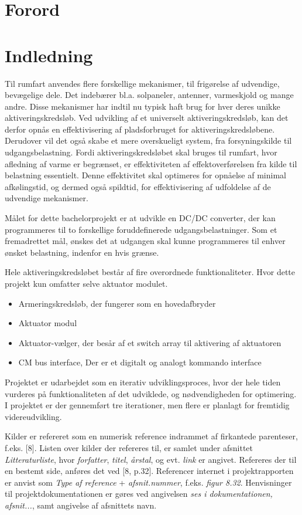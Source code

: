 
\chapter*{Forord}


{\let\clearpage\relax \chapter{Indledning}}
Til rumfart anvendes flere forskellige mekanismer, til frigørelse af udvendige, bevægelige dele. Det indebærer bl.a. solpaneler, antenner, varmeskjold og mange andre. Disse mekanismer har indtil nu typisk haft brug for hver deres unikke aktiveringskredsløb. Ved udvikling af et universelt aktiveringskredsløb, kan det derfor opnås en effektivisering af pladsforbruget for aktiveringskredsløbene. Derudover vil det også skabe et mere overskueligt system, fra forsyningskilde til udgangsbelastning. Fordi aktiveringskredsløbet skal bruges til rumfart, hvor afledning af varme er begrænset, er effektiviteten af effektoverførelsen fra kilde til belastning essentielt. Denne effektivitet skal optimeres for opnåelse af minimal afkølingstid, og dermed også spildtid, for effektivisering af udfoldelse af de udvendige mekanismer\cite{projekt-oplag}. 

Målet for dette bachelorprojekt er at udvikle en DC/DC converter, der kan programmeres til to forskellige foruddefinerede udgangsbelastninger. Som et fremadrettet mål, ønskes det at udgangen skal kunne programmeres til enhver ønsket belastning, indenfor en hvis grænse. 

\noindent
Hele aktiveringskredsløbet består af fire overordnede funktionaliteter. Hvor dette projekt kun omfatter selve aktuator modulet.
\begin{itemize}
	\item Armeringskredsløb, der fungerer som en hovedafbryder
	\item Aktuator modul
	\item Aktuator-vælger, der besår af et switch array til aktivering af aktuatoren
	\item CM bus interface, Der er et digitalt og analogt kommando interface
\end{itemize}

Projektet er udarbejdet som en iterativ udviklingsproces, hvor der hele tiden vurderes på funktionaliteten af det udviklede, og nødvendigheden for optimering. I projektet er der gennemført tre iterationer, men flere er planlagt for fremtidig videreudvikling. 

Kilder er refereret som en numerisk reference indrammet af firkantede parenteser, f.eks. [8]. Listen over kilder der refereres til, er samlet under afsnittet \textit{Litteraturliste}, hvor \textit{forfatter}, \textit{titel}, \textit{årstal}, og evt. \textit{link} er angivet. Refereres der til en bestemt side, anføres det ved [8, p.32]. Referencer internet i projektrapporten er anvist som \textit{Type af reference} + \textit{afsnit.nummer}, f.eks. \textit{figur 8.32}. Henvisninger til projektdokumentationen er gøres ved  angivelsen \textit{ses i dokumentationen, afsnit...}, samt angivelse af afsnittets navn. 
